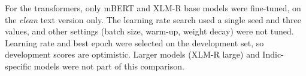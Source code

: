 For the transformers, only mBERT and XLM-R base models were fine-tuned, on the \emph{clean} text version only. The learning
rate search used a single seed and three values, and other settings (batch size, warm-up, weight decay) were not tuned.
Learning rate and best epoch were selected on the development set, so development scores are optimistic. Larger models
(XLM-R large) and Indic-specific models were not part of this comparison.
